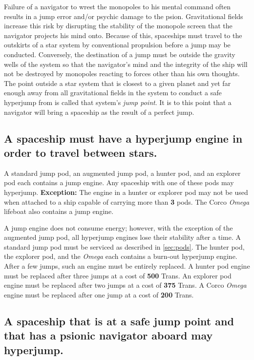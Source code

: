 Failure of a navigator to wrest the monopoles to his mental command
often results in a jump error and/or psychic damage to the psion.
Gravitational fields increase this risk by disrupting the stability of
the monopole screen that the navigator projects his mind onto. Because
of this, spaceships must travel to the outskirts of a star system by
conventional propulsion before a jump may be conducted. Conversely,
the destination of a jump must be outside the gravity wells of the
system so that the navigator's mind and the integrity of the ship will
not be destroyed by monopoles reacting to forces other than his own
thoughts. The point outside a star system that is closest to a given
planet and yet far enough away from all gravitational fields in the
system to conduct a safe hyperjump from is called that system's
\emph{jump point}. It is to this point that a navigator will bring a
spaceship as the result of a perfect jump.


\subsection[Hyperjump Engine]{A spaceship must have a hyperjump engine
  in order to 
  travel between stars.}
\label{sec:hyperjump-engine}



A standard jump pod, an augmented jump pod, a hunter pod, and an
explorer pod each contains a jump engine. Any spaceship with one of
these pods may hyperjump. \textbf{Exception:} The engine in a hunter
or explorer pod may not be used when attached to a ship capable of
carrying more than \textbf{3} pods. The Corco \emph{Omega} lifeboat
also contains a jump engine.

A jump engine does not consume energy; however, with the exception of
the augmented jump pod, all hyperjump engines lose their stability
after a time. A standard jump pod must be serviced as described in
\ref{sec:pods}. The hunter pod, the explorer pod, and the \emph{Omega}
each contains a burn-out hyperjump engine. After a few jumps, such an
engine must be entirely replaced. A hunter pod engine must be replaced
after three jumps at a cost of \textbf{500} Trans. An explorer pod
engine must be replaced after two jumps at a cost of \textbf{375}
Trans. A Corco \emph{Omega} engine must be replaced after one jump at
a cost of \textbf{200} Trans.



\subsection[Jump Point]{A spaceship that is at a safe jump point and
  that has a
  psionic navigator aboard may hyperjump.}
\label{sec:jump-point}



